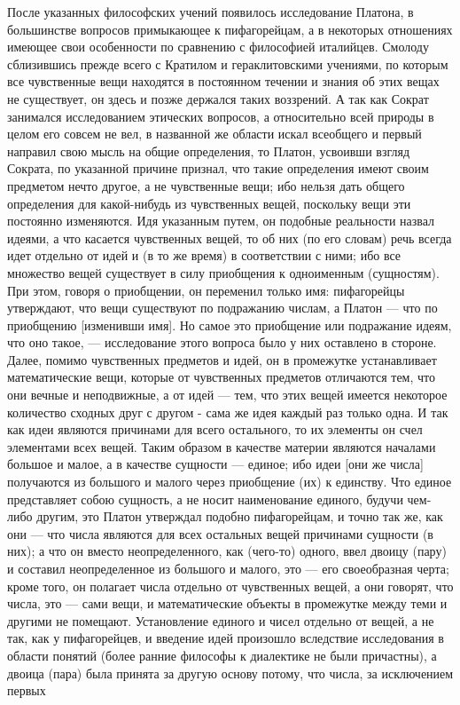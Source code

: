 \documentclass{article}
\begin{document}
После указанных философских учений появилось исследование Платона, в большинстве вопросов примыкающее к пифагорейцам, а в некоторых отношениях имеющее свои особенности по сравнению с философией италийцев. Смолоду сблизившись прежде всего с Кратилом и гераклитовскими учениями, по которым все чувственные вещи находятся в постоянном течении и знания об этих вещах не существует, он здесь и позже держался таких воззрений. А так как Сократ занимался исследованием этических вопросов, а относительно всей природы в целом его совсем не вел, в названной же области искал всеобщего и первый направил свою мысль на общие определения, то Платон, усвоивши взгляд Сократа, по указанной причине признал, что такие определения имеют своим предметом нечто другое, а не чувственные вещи; ибо нельзя дать общего определения для какой-нибудь из чувственных вещей, поскольку вещи эти постоянно изменяются. Идя указанным путем, он подобные реальности
\footnotemark[1]
назвал идеями, а что касается чувственных вещей, то об них (по его словам) речь всегда идет
\footnotemark[2]
отдельно от идей и (в то же время) в соответствии с ними; ибо все множество вещей существует в силу приобщения к одноименным (сущностям).
\footnotemark[3]
При этом, говоря о приобщении, он переменил только имя: пифагорейцы утверждают, что вещи существуют по подражанию числам, а Платон — что по приобщению [изменивши имя].
\footnotemark[4]
Но самое это приобщение или подражание идеям, что оно такое, — исследование этого вопроса было у них оставлено в стороне. Далее, помимо чувственных предметов и идей, он в промежутке устанавливает математические вещи, которые от чувственных предметов отличаются тем, что они вечные и неподвижные, а от идей — тем, что этих вещей имеется некоторое количество сходных друг с другом - сама же идея каждый раз только одна. И так как идеи являются причинами для всего остального, то их элементы он счел элементами всех вещей. Таким образом в качестве материи являются началами большое и малое, а в качестве сущности — единое; ибо идеи [они же числа]
\footnotemark[5]
получаются из большого и малого через приобщение (их) к единству. Что единое представляет собою сущность, а не носит наименование единого, будучи чем-либо другим, это Платон утверждал подобно пифагорейцам, и точно так же, как они
\footnotemark[6]
— что числа являются для всех остальных вещей причинами сущности (в них); а что он вместо неопределенного, как (чего-то) одного, ввел двоицу (пару) и составил неопределенное из большого и малого, это — его своеобразная черта; кроме того, он полагает числа отдельно от чувственных вещей, а они говорят, что числа, это — сами вещи, и математические объекты в промежутке между теми и другими не помещают. Установление единого и чисел отдельно от вещей, а не так, как у пифагорейцев, и введение идей произошло вследствие исследования в области понятий (более ранние философы к диалектике не были причастны), а двоица (пара) была принята за другую основу потому, что числа, за исключением первых
\end{document}
